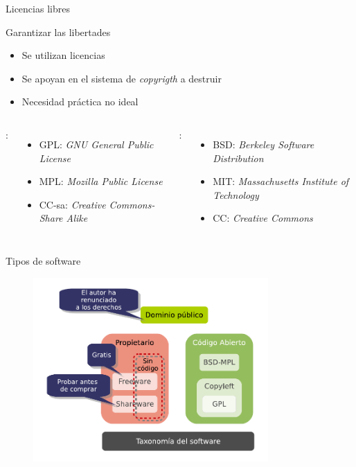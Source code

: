\documentclass{beamer}
\begin{document}
\begin{frame}{Licencias libres}

  \begin{block}{Garantizar las libertades}
    \begin{itemize}
    \item Se utilizan licencias
    \item Se apoyan en el sistema de \textit{copyrigth} a destruir
    \item Necesidad práctica no ideal
    \end{itemize}
  \end{block}

  
  {\footnotesize
    \begin{columns}[t]
      :
      \begin{itemize}
      \item GPL: \emph{GNU General Public License}
      \item MPL: \emph{Mozilla Public License}
      \item CC-sa: \emph{Creative Commons-Share Alike}
      \end{itemize}

      :
      \begin{itemize}
      \item BSD: \emph{Berkeley Software Distribution}
      \item MIT: \emph{Massachusetts Institute of Technology}
      \item CC: \emph{Creative Commons}
      \end{itemize}
    \end{columns}
  }
\end{frame}

\begin{frame}{Tipos de software}
  \begin{figure}
    \centering
    \includegraphics[width=0.8\textwidth]{pics/taxonomia.pdf}
  \end{figure}
\end{frame}
\end{document}
